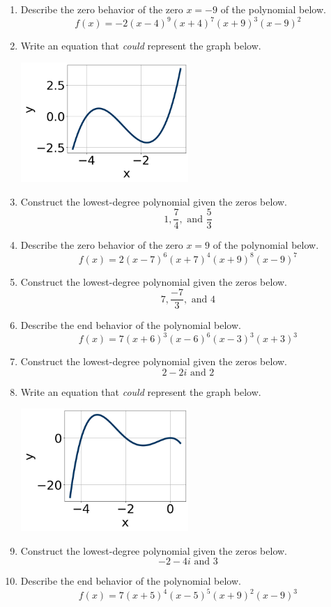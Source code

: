 \documentclass[14pt]{extbook}
\begin{document}
\begin{enumerate}
\item{
Describe the zero behavior of the zero $x = -9$ of the polynomial below.\[ f(x) = -2(x - 4)^{9}(x + 4)^{7}(x + 9)^{3}(x - 9)^{2} \]} \newpage
\item{
Write an equation that \textit{could} represent the graph below.
\begin{center}
    \includegraphics[width=0.5\textwidth]{../Figures/polyGraphToFunctionC.png}
\end{center}
} \newpage
\item{
Construct the lowest-degree polynomial given the zeros below.\[ 1, \frac{7}{4}, \text{ and } \frac{5}{3} \]} \newpage
\item{
Describe the zero behavior of the zero $x = 9$ of the polynomial below.\[ f(x) = 2(x - 7)^{6}(x + 7)^{4}(x + 9)^{8}(x - 9)^{7} \]} \newpage
\item{
Construct the lowest-degree polynomial given the zeros below.\[ 7, \frac{-7}{3}, \text{ and } 4 \]} \newpage
\item{
Describe the end behavior of the polynomial below.\[ f(x) = 7(x + 6)^{3}(x - 6)^{6}(x - 3)^{3}(x + 3)^{3} \]} \newpage
\item{
Construct the lowest-degree polynomial given the zeros below.\[ 2 - 2 i \text{ and } 2 \]} \newpage
\item{
Write an equation that \textit{could} represent the graph below.
\begin{center}
    \includegraphics[width=0.5\textwidth]{../Figures/polyGraphToFunctionCopyC.png}
\end{center}
} \newpage
\item{
Construct the lowest-degree polynomial given the zeros below.\[ -2 - 4 i \text{ and } 3 \]} \newpage
\item{
Describe the end behavior of the polynomial below.\[ f(x) = 7(x + 5)^{4}(x - 5)^{5}(x + 9)^{2}(x - 9)^{3} \]} \newpage
\end{enumerate}
\end{document}
